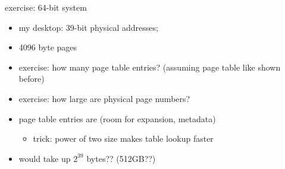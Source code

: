 \usetikzlibrary{shapes.callouts}

\begin{frame}[fragile,label=64bExA]{exercise: 64-bit system}
\begin{itemize}
\item my desktop: 39-bit physical addresses; 
\item 4096 byte pages
\item<3-> exercise: how many page table entries? (assuming page table like shown before)
\item<3-> exercise: how large are physical page numbers?
\item<5-> page table entries are  (room for expansion, metadata)
    \begin{itemize}
    \item trick: power of two size makes table lookup faster
    \end{itemize}
\item<5-> would take up $2^{39}$ bytes?? (512GB??)
\end{itemize}
\end{frame}
